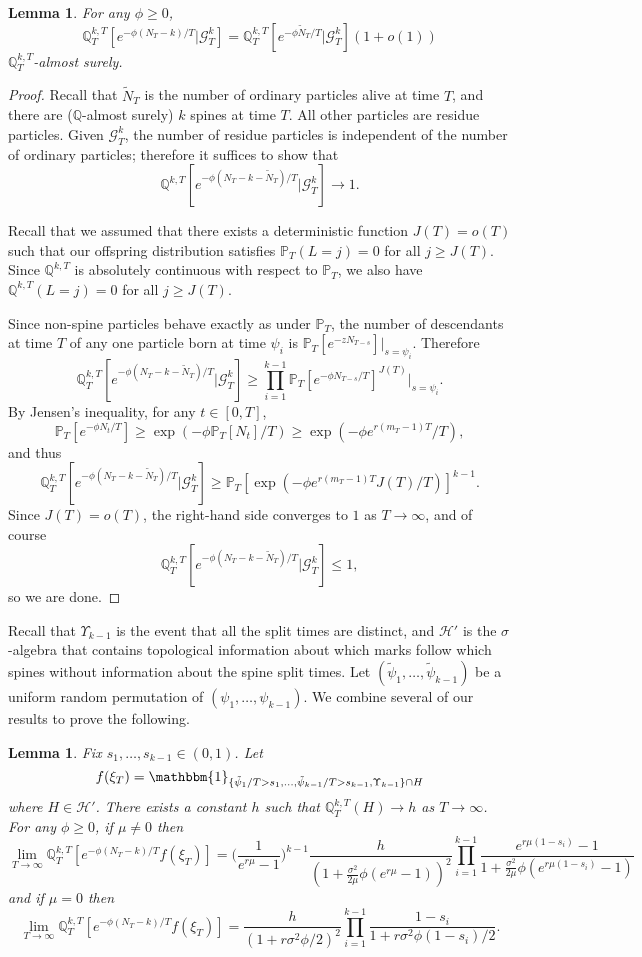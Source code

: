 \documentclass{article}
\theoremstyle{plain}
\newtheorem{lem}[thm]{Lemma}
\theoremstyle{definition}
\newcommand{\Q}{\mathbb{Q}}
\renewcommand{\P}{\mathbb{P}}
\newcommand{\G}{\mathcal{G}}
\newcommand{\ind}{\mathbbm{1}}
\begin{document}
\begin{lem}\label{noresidue}
For any $\phi\ge 0$,
\[\Q^{k,T}_T[e^{-\phi (N_T-k)/T} | \G^k_T] = \Q^{k,T}_T[e^{-\phi \tilde N_T / T} | \G^k_T](1+o(1))\]
$\Q^{k,T}_T$-almost surely.
\end{lem}

\begin{proof}
Recall that $\tilde N_T$ is the number of ordinary particles alive at time $T$, and there are ($\Q$-almost surely) $k$ spines at time $T$. All other particles are residue particles. Given $\G^k_T$, the number of residue particles is independent of the number of ordinary particles; therefore it suffices to show that
\[\Q^{k,T}[e^{-\phi (N_T - k - \tilde N_T)/T} | \G^k_T] \to 1.\]

Recall that we assumed that there exists a deterministic function $J(T)=o(T)$ such that our offspring distribution satisfies $\P_T(L=j)=0$ for all $j\ge J(T)$. Since $\Q^{k,T}$ is absolutely continuous with respect to $\P_T$, we also have $\Q^{k,T}(L=j)=0$ for all $j\ge J(T)$.

Since non-spine particles behave exactly as under $\P_T$, the number of descendants at time $T$ of any one particle born at time $\psi_i$ is $\P_T[e^{-zN_{T-s}}]|_{s=\psi_i}$. Therefore
\[\Q^{k,T}_T[e^{-\phi(N_T - k - \tilde N_T)/T}|\G^k_T] \ge \prod_{i=1}^{k-1} \P_T[e^{-\phi N_{T-s}/T}]^{J(T)}\Big|_{s=\psi_i}.\]
By Jensen's inequality, for any $t\in[0,T]$,
\[\P_T[e^{-\phi N_t/T}] \ge \exp(-\phi\P_T[N_t]/T) \ge \exp(-\phi e^{r(m_T-1)T}/T),\]
and thus
\[\Q^{k,T}_T[e^{-\phi(N_T - k - \tilde N_T)/T}|\G^k_T] \ge \P_T[\exp(-\phi e^{r(m_T-1)T} J(T) / T)]^{k-1}.\]
Since $J(T)=o(T)$, the right-hand side converges to $1$ as $T\to\infty$, and of course
\[\Q^{k,T}_T[e^{-\phi(N_T - k - \tilde N_T)/T}|\G^k_T]\le 1,\]
so we are done.
\end{proof}

Recall that $\Upsilon_{k-1}$ is the event that all the split times are distinct, and $\mathcal H'$ is the $\sigma$-algebra that contains topological information about which marks follow which spines without information about the spine split times. Let $(\tilde \psi_1,\ldots,\tilde \psi_{k-1})$ be a uniform random permutation of $(\psi_1,\ldots,\psi_{k-1})$. We combine several of our results to prove the following.

\begin{lem}\label{combineasymp}
Fix $s_1,\ldots,s_{k-1}\in(0,1)$. Let
\[f(\xi_T) = \ind_{\{\tilde \psi_1/T > s_1,\ldots, \tilde\psi_{k-1}/T > s_{k-1},\Upsilon_{k-1}\}\cap H}\]
where $H\in\mathcal H'$. There exists a constant $h$ such that $\Q^{k,T}_T(H)\to h$ as $T\to\infty$. For any $\phi\ge0$, if $\mu\neq 0$ then
\[\lim_{T\to\infty} \Q^{k,T}_T[e^{-\phi(N_T-k)/T}f(\xi_T)] = \Big(\frac{1}{e^{r\mu}-1}\Big)^{k-1} \frac{h}{(1+\frac{\sigma^2}{2\mu}\phi(e^{r\mu}-1))^2} \prod_{i=1}^{k-1} \frac{e^{r\mu(1-s_i)}-1}{1+\frac{\sigma^2}{2\mu}\phi (e^{r\mu(1-s_i)}-1)}\]
and if $\mu=0$ then
\[\lim_{T\to\infty} \Q^{k,T}_T[e^{-\phi(N_T-k)/T}f(\xi_T)] = \frac{h}{(1+r\sigma^2\phi/2)^2} \prod_{i=1}^{k-1} \frac{1-s_i}{1+r\sigma^2\phi (1-s_i)/2}.\]
\end{lem}
\end{document}
